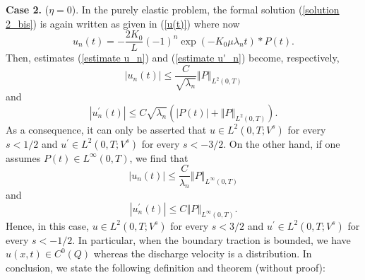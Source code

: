 \documentclass[12pt,a4paper]{amsart}
\theoremstyle{definition}
\begin{document}
{\bf Case 2.} ($\eta =0$). In the purely elastic problem, the formal solution (\ref{solution 2_bis}) is again
written as given in (\ref{u(t)}) where now%
\begin{equation*}
u_{n}\left( t\right) =-\frac{2K_{0}}{L}\left( -1\right) ^{n}\exp \left(
-K_{0}\mu \lambda _{n}t\right) \ast P\left( t\right).
\end{equation*}%
Then, estimates (\ref{estimate u_n}) and (\ref{estimate u'_n}) become, respectively,%
\begin{equation*}
\left\vert u_{n}\left( t\right) \right\vert \leq \frac{C}{\sqrt{\lambda _{n}}%
}\left\Vert P\right\Vert _{L^{2}\left( 0,T\right) }
\end{equation*}%
and%
\begin{equation*}
\left\vert u_{n}^{\prime }\left( t\right) \right\vert \leq C\sqrt{\lambda
_{n}}\left( \left\vert P\left( t\right) \right\vert +\left\Vert P\right\Vert
_{L^{2}\left( 0,T\right) }\right).
\end{equation*}%
As a consequence, it can only be asserted that $u\in L^{2}\left( 0,T;V^{s}\right) $
for every $s<1/2$ and $u^{\prime }\in L^{2}\left( 0,T;V^{s}\right) $ for
every $s<-3/2$. On the other hand, if one assumes $P\left( t\right) \in
L^{\infty }\left( 0,T\right) $, we find that%
\begin{equation*}
\left\vert u_{n}\left( t\right) \right\vert \leq \frac{C}{\lambda _{n}}%
\left\Vert P\right\Vert _{L^{\infty }\left( 0,T\right) }
\end{equation*}%
and%
\begin{equation*}
\left\vert u_{n}^{\prime }\left( t\right) \right\vert \leq C\left\Vert
P\right\Vert _{L^{\infty }\left( 0,T\right) }.
\end{equation*}%
Hence, in this case, $u\in L^{2}\left( 0,T;V^{s}\right) $ for every $s<3/2$
and $u^{\prime }\in L^{2}\left( 0,T;V^{s}\right) $ for every $s<-1/2$. In
particular, when the boundary traction is bounded, we have $u\left(
x,t\right) \in C^{0}\left( Q\right) $ whereas the discharge velocity is a
distribution. In conclusion, we state the following definition and theorem (without proof):
\end{document}
